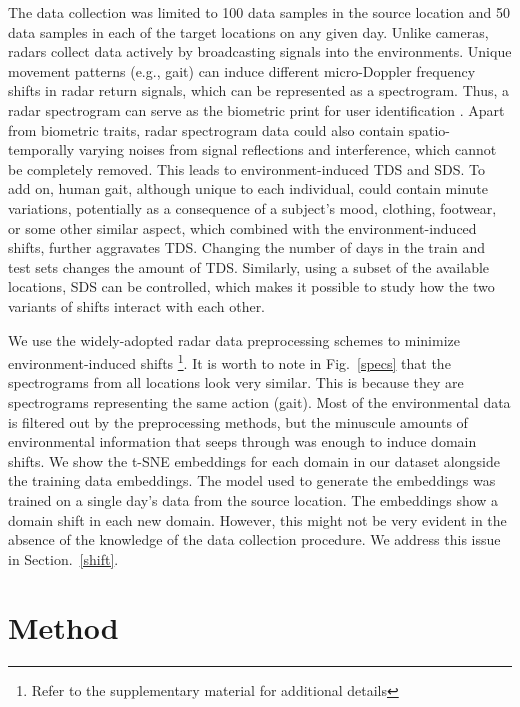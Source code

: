 \documentclass{article}
\begin{document}
The data collection was limited to 100 data samples in the source location and 50 data samples in each of the target locations on any given day.  Unlike cameras, radars collect data actively by broadcasting signals into the environments. Unique movement patterns (e.g., gait) can induce different micro-Doppler frequency shifts in radar return signals, which can be represented as a spectrogram. Thus, a radar spectrogram can serve as the biometric print for user identification \cite{wifigait1,pokkunuru2018neuralwave, jakkala2019deep, janakaraj2019star, pegoraro2020multi, huang2020multi, lang2019person, abdulatif2018study, qiao2020human, lang2019joint}. Apart from biometric traits, radar spectrogram data could also contain spatio-temporally varying noises from signal reflections and interference, which cannot be completely removed. This leads to environment-induced TDS and SDS. To add on, human gait, although unique to each individual, could contain minute variations, potentially as a consequence of a subject's mood, clothing, footwear, or some other similar aspect, which combined with the environment-induced shifts, further aggravates TDS. Changing the number of days in the train and test sets changes the amount of TDS. Similarly, using a subset of the available locations, SDS can be controlled, which makes it possible to study how the two variants of shifts interact with each other. 

We use the widely-adopted radar data preprocessing schemes to minimize environment-induced shifts \cite{wifigait1,janakaraj2019star,pegoraro2020multi}\footnote{Refer to the supplementary material for additional details}. It is worth to note in Fig.~\ref{specs} that the spectrograms from all locations look very similar. This is because they are spectrograms representing the same action (gait). Most of the environmental data is filtered out by the preprocessing methods, but the minuscule amounts of environmental information that seeps through was enough to induce domain shifts. We show the t-SNE \cite{maaten2008visualizing} embeddings for each domain in our dataset alongside the training data embeddings. The model used to generate the embeddings was trained on a single day's data from the source location. The embeddings show a domain shift in each new domain. However, this might not be very evident in the absence of the knowledge of the data collection procedure. We address this issue in Section.~\ref{shift}.

\section{Method}
\label{method}
\end{document}
